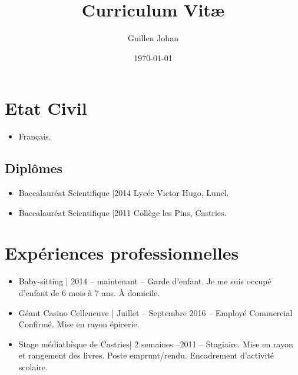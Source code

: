 \documentclass[a4paper]{article}
\title{Curriculum Vit\ae}
\author{Guillen Johan}
\date{\today}
\begin{document}
    \maketitle

    \section*{\’Etat Civil}

    \begin{itemize}
        \item Français.
    \end{itemize}

    \subsection*{Diplômes}
    
        \begin{itemize}
            \item Baccalauréat Scientifique |2014 \newline
                Lycée Victor Hugo, Lunel.
            \item Baccalauréat Scientifique |2011\newline
                Collège les Pins, Castries.
        \end{itemize}
    
    
    \section*{Expériences professionnelles}
    
        \begin{itemize}
            \item Baby-sitting | 2014 – maintenant – \newline
                Garde d’enfant. \newline
                Je me suis occupé d’enfant de 6 mois à 7 ans.
                À domicile.
            
            \item Géant Casino Celleneuve | Juillet – Septembre 2016 –\newline
                Employé Commercial Confirmé.\newline
                Mise en rayon épicerie.
                
            \item Stage médiathèque de Castries| 2 semaines –2011 – \newline
                Stagiaire.\newline
                Mise en rayon et rangement des livres.\newline
                Poste emprunt/rendu.\newline
                Encadrement d’activité scolaire.\newline
        \end{itemize}
    
\end{document}
